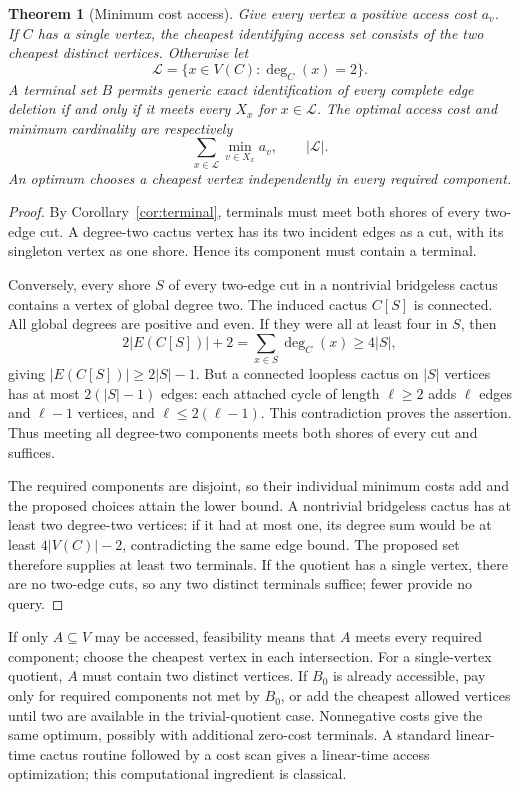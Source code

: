 \documentclass[11pt,letterpaper]{article}
\newtheorem{theorem}{Theorem}
\begin{document}
\begin{theorem}[Minimum cost access]\label{thm:access}
Give every vertex a positive access cost $a_v$. If $C$ has a single vertex, the cheapest identifying access set consists of the two cheapest distinct vertices. Otherwise let
\[
 \mathcal L=\{x\in V(C):\deg_C(x)=2\}.
\]
A terminal set $B$ permits generic exact identification of every complete edge deletion if and only if it meets every $X_x$ for $x\in\mathcal L$. The optimal access cost and minimum cardinality are respectively
\[
 \sum_{x\in\mathcal L}\min_{v\in X_x}a_v,
 \qquad |\mathcal L|.
\]
An optimum chooses a cheapest vertex independently in every required component.
\end{theorem}
\begin{proof}
By Corollary~\ref{cor:terminal}, terminals must meet both shores of every two-edge cut. A degree-two cactus vertex has its two incident edges as a cut, with its singleton vertex as one shore. Hence its component must contain a terminal.

Conversely, every shore $S$ of every two-edge cut in a nontrivial bridgeless cactus contains a vertex of global degree two. The induced cactus $C[S]$ is connected. All global degrees are positive and even. If they were all at least four in $S$, then
\[
 2|E(C[S])|+2=\sum_{x\in S}\deg_C(x)\ge4|S|,
\]
giving $|E(C[S])|\ge2|S|-1$. But a connected loopless cactus on $|S|$ vertices has at most $2(|S|-1)$ edges: each attached cycle of length $\ell\ge2$ adds $\ell$ edges and $\ell-1$ vertices, and $\ell\le2(\ell-1)$. This contradiction proves the assertion. Thus meeting all degree-two components meets both shores of every cut and suffices.

The required components are disjoint, so their individual minimum costs add and the proposed choices attain the lower bound. A nontrivial bridgeless cactus has at least two degree-two vertices: if it had at most one, its degree sum would be at least $4|V(C)|-2$, contradicting the same edge bound. The proposed set therefore supplies at least two terminals. If the quotient has a single vertex, there are no two-edge cuts, so any two distinct terminals suffice; fewer provide no query.
\end{proof}

If only $A\subseteq V$ may be accessed, feasibility means that $A$ meets every required component; choose the cheapest vertex in each intersection. For a single-vertex quotient, $A$ must contain two distinct vertices. If $B_0$ is already accessible, pay only for required components not met by $B_0$, or add the cheapest allowed vertices until two are available in the trivial-quotient case. Nonnegative costs give the same optimum, possibly with additional zero-cost terminals. A standard linear-time cactus routine followed by a cost scan gives a linear-time access optimization; this computational ingredient is classical.
\end{document}
